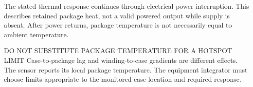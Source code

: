 \documentclass[10pt]{article}
\begin{document}
The stated thermal response continues through electrical power interruption. This describes retained package heat, not a valid powered output while supply is absent. After power returns, package temperature is not necessarily equal to ambient temperature.
\begin{Notice}{DO NOT SUBSTITUTE PACKAGE TEMPERATURE FOR A HOTSPOT LIMIT}
Case-to-package lag and winding-to-case gradients are different effects. The sensor reports its local package temperature. The equipment integrator must choose limits appropriate to the monitored case location and required response.
\end{Notice}
\vfill{}
\end{document}
